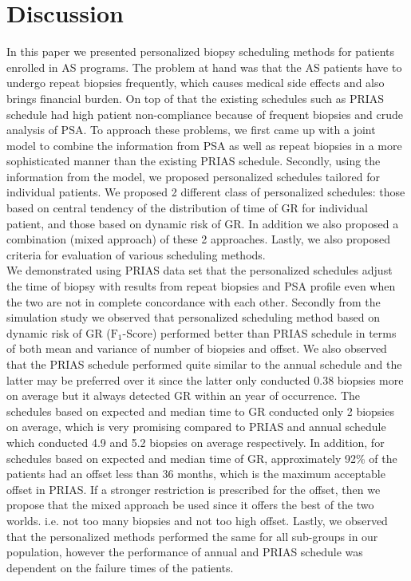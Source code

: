 
\section{Discussion}
\label{sec: discussion}
In this paper we presented personalized biopsy scheduling methods for patients enrolled in AS programs. The problem at hand was that the AS patients have to undergo repeat biopsies frequently, which causes medical side effects and also brings financial burden. On top of that the existing schedules such as PRIAS schedule had high patient non-compliance because of frequent biopsies and crude analysis of PSA. To approach these problems, we first came up with a joint model to combine the information from PSA as well as repeat biopsies in a more sophisticated manner than the existing PRIAS schedule. Secondly, using the information from the model, we proposed personalized schedules tailored for individual patients. We proposed 2 different class of personalized schedules: those based on central tendency of the distribution of time of GR for individual patient, and those based on dynamic risk of GR. In addition we also proposed a combination (mixed approach) of these 2 approaches. Lastly, we also proposed criteria for evaluation of various scheduling methods.\\

We demonstrated using PRIAS data set that the personalized schedules adjust the time of biopsy with results from repeat biopsies and PSA profile even when the two are not in complete concordance with each other. Secondly from the simulation study we observed that personalized scheduling method based on dynamic risk of GR ($\text{F}_1$-Score) performed better than PRIAS schedule in terms of both mean and variance of number of biopsies and offset. We also observed that the PRIAS schedule performed quite similar to the annual schedule and the latter may be preferred over it since the latter only conducted 0.38 biopsies more on average but it always detected GR within an year of occurrence. The schedules based on expected and median time to GR conducted only 2 biopsies on average, which is very promising compared to PRIAS and annual schedule which conducted 4.9 and 5.2 biopsies on average respectively. In addition, for schedules based on expected and median time of GR, approximately 92\% of the patients had an offset less than 36 months, which is the maximum acceptable offset in PRIAS. If a stronger restriction is prescribed for the offset, then we propose that the mixed approach be used since it offers the best of the two worlds. i.e. not too many biopsies and not too high offset. Lastly, we observed that the personalized methods performed the same for all sub-groups in our population, however the performance of annual and PRIAS schedule was dependent on the failure times of the patients.\\

